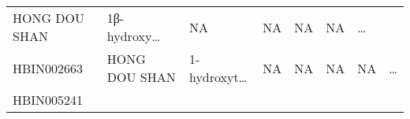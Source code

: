\documentclass[
]{article}
\begin{document}
\begin{longtable}[]{@{}llllllll@{}}
\begin{minipage}[t]{0.11\columnwidth}
HONG DOU SHAN\strut
\end{minipage} & \begin{minipage}[t]{0.14\columnwidth}\raggedright
1β-hydroxy\ldots{}\strut
\end{minipage} & \begin{minipage}[t]{0.14\columnwidth}\raggedright
NA\strut
\end{minipage} & \begin{minipage}[t]{0.08\columnwidth}\raggedright
NA\strut
\end{minipage} & \begin{minipage}[t]{0.09\columnwidth}\raggedright
NA\strut
\end{minipage} & \begin{minipage}[t]{0.11\columnwidth}\raggedright
NA\strut
\end{minipage} & \begin{minipage}[t]{0.03\columnwidth}\raggedright
\ldots{}\strut
\end{minipage}\tabularnewline
\begin{minipage}[t]{0.11\columnwidth}\raggedright
HBIN002663\strut
\end{minipage} & \begin{minipage}[t]{0.11\columnwidth}\raggedright
HONG DOU SHAN\strut
\end{minipage} & \begin{minipage}[t]{0.14\columnwidth}\raggedright
1-hydroxyt\ldots{}\strut
\end{minipage} & \begin{minipage}[t]{0.14\columnwidth}\raggedright
NA\strut
\end{minipage} & \begin{minipage}[t]{0.08\columnwidth}\raggedright
NA\strut
\end{minipage} & \begin{minipage}[t]{0.09\columnwidth}\raggedright
NA\strut
\end{minipage} & \begin{minipage}[t]{0.11\columnwidth}\raggedright
NA\strut
\end{minipage} & \begin{minipage}[t]{0.03\columnwidth}\raggedright
\ldots{}\strut
\end{minipage}\tabularnewline
\begin{minipage}[t]{0.11\columnwidth}\raggedright
HBIN005241\strut
\end{minipage} & \begin{minipage}[t]{0.11\columnwidth}\raggedright

\end{minipage}
\end{longtable}
\end{document}
